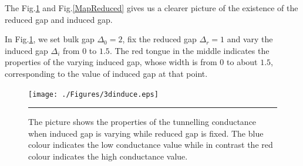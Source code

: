 The Fig.\ref{MapInduced} and Fig.\ref{MapReduced} gives us a clearer picture of the existence of the reduced gap and induced gap.

In Fig.\ref{MapInduced}, we set bulk gap $\Delta_0=2$, fix the reduced gap $\Delta_r=1$ and vary the induced gap $\Delta_i$ from $0$ to $1.5$.  The red tongue in the middle indicates the properties of the varying induced gap, whose width is from $0$ to about $1.5$, corresponding to the value of induced gap at that point.
\begin{figure}[htbp]
\small
	\centering
		\texttt{[image: ./Figures/3dinduce.eps]}
		\rule{35em}{0.5pt}
	\caption[An Electron]{The picture shows the properties of the tunnelling conductance when induced gap is varying while reduced gap is fixed. The blue colour indicates the low conductance value while in contrast the red colour indicates the high conductance value.}
	\label{MapInduced}
\end{figure}

